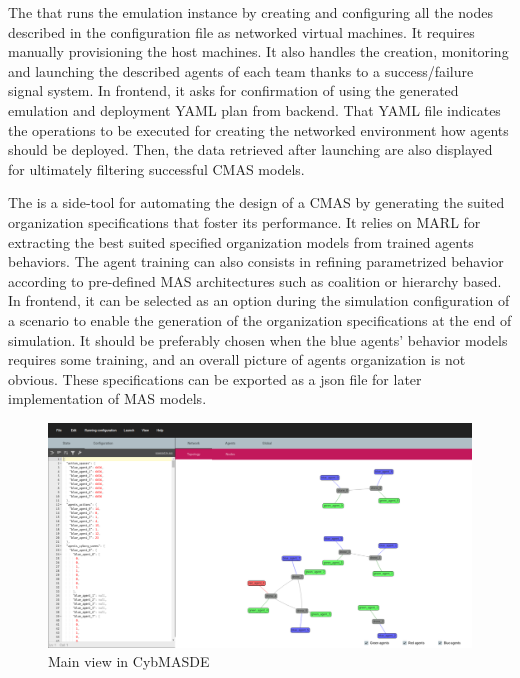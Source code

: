 \documentclass[sigconf]{aamas}
\begin{document}
The  that runs the emulation instance by creating and configuring all the nodes described in the configuration file as networked virtual machines. It requires manually provisioning the host machines. It also handles the creation, monitoring and launching the described agents of each team thanks to a success/failure signal system. In frontend, it asks for confirmation of using the generated emulation and deployment YAML plan from backend. That YAML file indicates the operations to be executed for creating the networked environment how agents should be deployed. Then, the data retrieved after launching are also displayed for ultimately filtering successful CMAS models.

The  is a side-tool for automating the design of a CMAS by generating the suited organization specifications that foster its performance. It relies on MARL for extracting the best suited specified organization models from trained agents behaviors. The agent training can also consists in refining parametrized behavior according to pre-defined MAS architectures such as coalition or hierarchy based. In frontend, it can be selected as an option during the simulation configuration of a scenario to enable the generation of the organization specifications at the end of simulation. It should be preferably chosen when the blue agents' behavior models requires some training, and an overall picture of agents organization is not obvious. These specifications can be exported as a json file for later implementation of MAS models.

\begin{figure}[h]
  \centering
  \includegraphics[width=\linewidth]{CybMASDE_main_view.png}
  \caption{Main view in CybMASDE}
  \label{fig:screenshot}
\end{figure}
\end{document}
